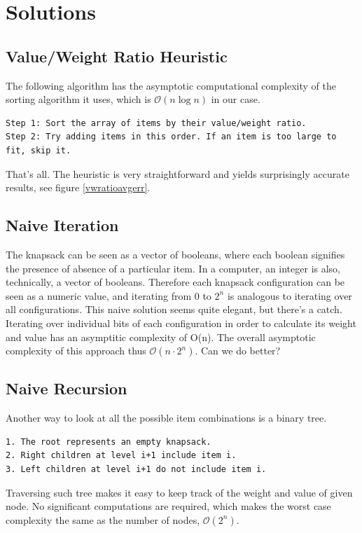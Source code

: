 \documentclass[a4paper,10pt,twocolumn]{article}
\begin{document}
\section{Solutions}
\subsection{Value/Weight Ratio Heuristic}
The following algorithm has the asymptotic computational complexity of the sorting algorithm it uses,
which is $\mathcal{O}(n\log{}n)$ in our case.
\begin{lstlisting}
Step 1: Sort the array of items by their value/weight ratio.
Step 2: Try adding items in this order. If an item is too large to fit, skip it.
\end{lstlisting}
That's all. The heuristic is very straightforward and yields surprisingly accurate results, see figure \ref{vwratioavgerr}.

\subsection{Naive Iteration}
The knapsack can be seen as a vector of booleans, where each boolean signifies the presence of absence of a particular
item. In a computer, an integer is also, technically, a vector of booleans. Therefore each knapsack configuration can be
seen as a numeric value, and iterating from $0$ to $2^n$ is analogous to iterating over all configurations. This naive
solution seems quite elegant, but there's a catch. Iterating over individual bits of each configuration in order to
calculate its weight and value has an asymptitic complexity of O(n). The overall asymptotic complexity of this approach
thus $\mathcal{O}(n\cdot2^n)$. Can we do better?

\subsection{Naive Recursion} \label{naiverec}
Another way to look at all the possible item combinations is a binary tree.
\begin{lstlisting}
1. The root represents an empty knapsack.
2. Right children at level i+1 include item i.
3. Left children at level i+1 do not include item i.
\end{lstlisting}
Traversing such tree makes it easy to keep track of the weight and value of given node. No significant computations are
required, which makes the worst case complexity the same as the number of nodes, $\mathcal{O}(2^n)$.
\end{document}

